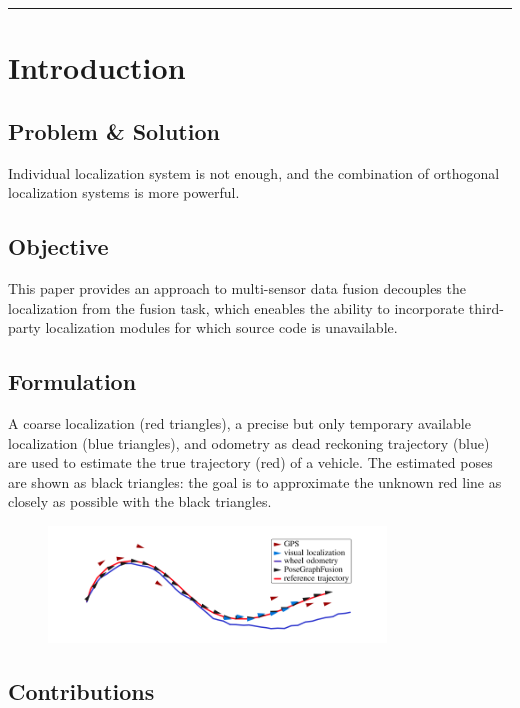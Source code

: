 \documentclass[letterpaper,11pt]{article}
\begin{document}
\begin{center}\rule{\textwidth}{1pt}\end{center}
\section{Introduction}

\subsection{Problem \& Solution}

Individual localization system is not enough, and the combination of orthogonal localization systems is more powerful.

\subsection{Objective}

This paper provides an approach to multi-sensor data fusion decouples the localization from the fusion task, which eneables the ability to incorporate third-party localization modules for which source code is unavailable.

\subsection{Formulation}

A coarse localization (red triangles), a precise but only temporary available localization (blue triangles), and odometry as dead reckoning trajectory (blue) are used to estimate the true trajectory (red) of a vehicle. The estimated poses are shown as black triangles: the goal is to approximate the unknown red line as closely as possible with the black triangles.

\begin{figure}[!ht]
	\centering
	\includegraphics[width=0.8\textwidth]{./img/posefusion.png}
\end{figure}

\subsection{Contributions}
\end{document}

